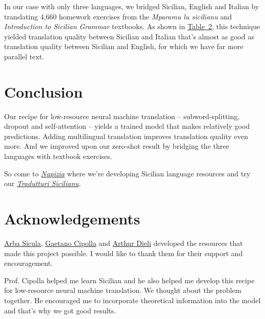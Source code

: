 \documentclass[10pt,letterpaper]{article}
\begin{document}
In our case with only three languages, we bridged
Sicilian, English and Italian by translating 4,660 homework exercises from
the \textit{Mparamu lu sicilianu} \citep{cipolla2013} and 
\textit{Introduction to Sicilian Grammar} \citep{bonner2001} textbooks.
As shown in \hyperlink{bleuscores}{Table~2},
this technique yielded translation quality between Sicilian and Italian
that's almost as good as translation quality between Sicilian and English,
for which we have far more parallel text.




\hypertarget{conclusion}{}

\section{Conclusion}

Our recipe for low-resource neural machine translation -- subword-splitting,
dropout and self-attention -- yields a trained model that makes relatively good predictions.
Adding multilingual translation improves translation quality even more.
And we improved upon our zero-shot result by bridging the three languages with textbook exercises.

So come to \textit{\href{https://www.napizia.com/}{Napizia}}
where we're developing Sicilian language resources
and try our \textit{\href{https://translate.napizia.com/}{Tradutturi Sicilianu}}.










\hypertarget{acknowledgements}{}

\section*{Acknowledgements}

\vspace{-0.250em}
\href{https://www.arbasicula.org/}{Arba Sicula},
\href{https://en.wikipedia.org/wiki/Gaetano_Cipolla}{Gaetano Cipolla} and
\href{http://www.dieli.net/}{Arthur Dieli}
developed the resources that made this project possible.
I would like to thank them for their support and encouragement.

\vspace{-0.125em}
Prof. Cipolla helped me learn Sicilian and he also helped me develop this recipe for
low-resource neural machine translation.  We thought about the problem together.
He encouraged me to incorporate theoretical information into the model and that's
why we got good results.
\end{document}
